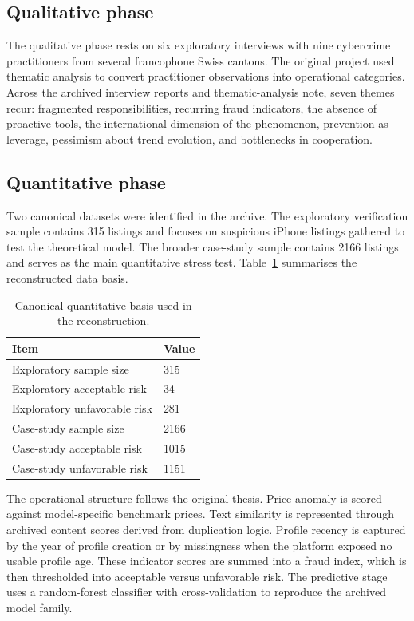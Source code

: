 \documentclass[11pt,a4paper]{article}
\begin{document}
\subsection{Qualitative phase}
The qualitative phase rests on six exploratory interviews with nine cybercrime practitioners from several francophone Swiss cantons. The original project used thematic analysis to convert practitioner observations into operational categories. Across the archived interview reports and thematic-analysis note, seven themes recur: fragmented responsibilities, recurring fraud indicators, the absence of proactive tools, the international dimension of the phenomenon, prevention as leverage, pessimism about trend evolution, and bottlenecks in cooperation.

\subsection{Quantitative phase}
Two canonical datasets were identified in the archive. The exploratory verification sample contains 315 listings and focuses on suspicious iPhone listings gathered to test the theoretical model. The broader case-study sample contains 2166 listings and serves as the main quantitative stress test. Table~\ref{tab:data-sources} summarises the reconstructed data basis.

\begin{table}[H]
\centering
\caption{Canonical quantitative basis used in the reconstruction.}
\label{tab:data-sources}
\begin{tabularx}{0.78\textwidth}{p{6.2cm} X}
\toprule
Item & Value \\
\midrule
Exploratory sample size & 315 \\
Exploratory acceptable risk & 34 \\
Exploratory unfavorable risk & 281 \\
Case-study sample size & 2166 \\
Case-study acceptable risk & 1015 \\
Case-study unfavorable risk & 1151 \\
\bottomrule
\end{tabularx}
\end{table}

The operational structure follows the original thesis. Price anomaly is scored against model-specific benchmark prices. Text similarity is represented through archived content scores derived from duplication logic. Profile recency is captured by the year of profile creation or by missingness when the platform exposed no usable profile age. These indicator scores are summed into a fraud index, which is then thresholded into acceptable versus unfavorable risk. The predictive stage uses a random-forest classifier with cross-validation to reproduce the archived model family.
\end{document}
